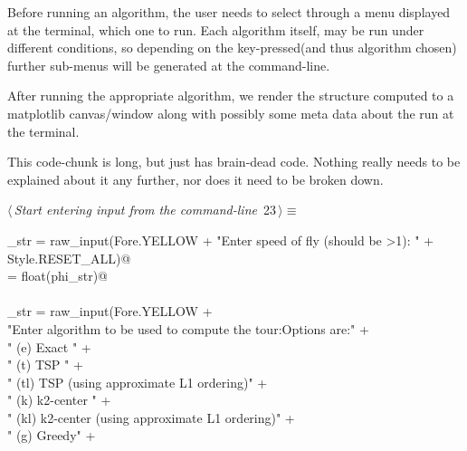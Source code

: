 \documentclass[11.5pt]{report}
\begin{document}
\vspace{-0.8cm}\newchunk Before running an algorithm, the user needs to select through 
a menu displayed at the terminal, which one to run. Each algorithm itself, may be 
run under different conditions, so depending on the key-pressed(and thus algorithm chosen) 
further sub-menus will be generated at the command-line. 

After running the appropriate algorithm, we render the structure computed to a matplotlib canvas/window
along with possibly some meta data about the run at the terminal. 

This code-chunk is long, but just has brain-dead code. Nothing really needs to be explained 
about it any further, nor does it need to be broken down. 


\begin{flushleft} \small\label{scrap26}\raggedright\small
{} $\langle\,${\itshape Start entering input from the command-line}\nobreak\ {\footnotesize {23}}$\,\rangle\equiv$
\vspace{-1ex}
\begin{list}{}{} \item
\mbox{}\verb@phi_str = raw_input(Fore.YELLOW + "Enter speed of fly (should be >1): " + Style.RESET_ALL)@\\
\mbox{}\verb@phi = float(phi_str)@\\
\mbox{}\verb@@\\
\mbox{}\verb@input_str = raw_input(Fore.YELLOW                                            +\@\\
\mbox{}\verb@          "Enter algorithm to be used to compute the tour:\n Options are:\n" +\@\\
\mbox{}\verb@        "  (e)    Exact \n"                                                  +\@\\
\mbox{}\verb@        "  (t)    TSP   \n"                                                  +\@\\
\mbox{}\verb@        "  (tl)   TSP   (using approximate L1 ordering)\n"                   +\@\\
\mbox{}\verb@        "  (k)    k2-center   \n"                                            +\@\\
\mbox{}\verb@        "  (kl)   k2-center (using approximate L1 ordering)\n"               +\@\\
\mbox{}\verb@        "  (g)    Greedy\n"                                                  +\@\\

\end{list}
\end{flushleft}
\end{document}
